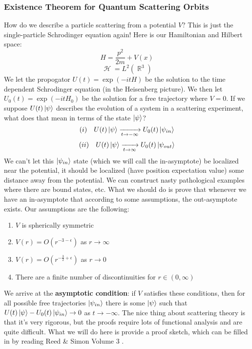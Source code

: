 \documentclass{article}
\DeclareMathOperator{\Hh}{{\mathcal{H}}}
\DeclareMathOperator{\RR}{\mathbb{R}}
\begin{document}
\subsubsection{Existence Theorem for Quantum Scattering Orbits}
How do we describe a particle scattering from a potential $V$? This is just the single-particle Schrodinger equation again! Here is our Hamiltonian and Hilbert space:
\[H = \frac{p^2}{2m}+V(x)\]
\[\Hh = L^2(\RR^3)\]
We let the propogator $U(t) = \exp(-itH)$ be the solution to the time dependent Schrodinger equation (in the Heisenberg picture). We then let $U_0(t) = \exp(-itH_0)$ be the solution for a free trajectory where $V=0$. If we suppose $U(t)\ket{\psi}$ describes the evolution of a system in a scattering experiment, what does that mean in terms of the state $\ket{\psi}$?
\[(i)\hspace{1em} U(t)\ket{\psi}\xrightarrow[t\to -\infty]{} U_0(t)\ket{\psi_{in}}\]
\[(ii) \hspace{1em}U(t)\ket{\psi}\xrightarrow[t\to \infty]{} U_0(t)\ket{\psi_{out}}\]
We can't let this $\ket{\psi_{in}}$ state (which we will call the in-asymptote) be localized near the potential, it should be localized (have position expectation value) some distance away from the potential. We can construct nasty pathological examples where there are bound states, etc. What we should do is prove that whenever we have an in-asymptote that according to some assumptions, the out-asymptote exists. Our assumptions are the following:
\begin{enumerate}
\item $V$ is spherically symmetric
\item $V(r) = O(r^{-3-\epsilon})$ as $r\to \infty$
\item $V(r) = O(r^{-\frac{3}{2}+\epsilon})$ as $r\to 0$
\item There are a finite number of discontinuities for $r\in (0,\infty)$
\end{enumerate}
We arrive at the \textbf{asymptotic condition}: if $V$ satisfies these conditions, then for all possible free trajectories $\ket{\psi_{in}}$ there is some $\ket{\psi}$ such that $U(t)\ket{\psi} - U_0(t)\ket{\psi_{in}} \to 0$ as $t\to -\infty$. The nice thing about scattering theory is that it's very rigorous, but the proofs require lots of functional analysis and are quite difficult. What we will do here is provide a proof sketch, which can be filled in by reading Reed \& Simon Volume 3 \cite{reed1979scattering}.
\end{document}
